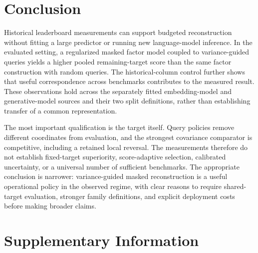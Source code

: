 \documentclass{article}
\begin{document}
\section{Conclusion}
Historical leaderboard measurements can support budgeted reconstruction without fitting a large predictor or running new language-model inference. In the evaluated setting, a regularized masked factor model coupled to variance-guided queries yields a higher pooled remaining-target score than the same factor construction with random queries. The historical-column control further shows that useful correspondence across benchmarks contributes to the measured result. These observations hold across the separately fitted embedding-model and generative-model sources and their two split definitions, rather than establishing transfer of a common representation.

The most important qualification is the target itself. Query policies remove different coordinates from evaluation, and the strongest covariance comparator is competitive, including a retained local reversal. The measurements therefore do not establish fixed-target superiority, score-adaptive selection, calibrated uncertainty, or a universal number of sufficient benchmarks. The appropriate conclusion is narrower: variance-guided masked reconstruction is a useful operational policy in the observed regime, with clear reasons to require shared-target evaluation, stronger family definitions, and explicit deployment costs before making broader claims.

\clearpage



\clearpage
\appendix
\section{Supplementary Information}
\end{document}
